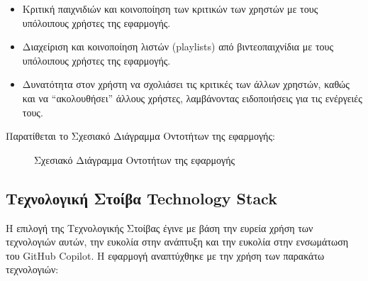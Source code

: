 \begin{itemize}
\item
  Κριτική παιχνιδιών και κοινοποίηση των κριτικών των χρηστών με τους
  υπόλοιπους χρήστες της εφαρμογής.
\item
  Διαχείριση και κοινοποίηση λιστών \textlatin{(playlists)} από
  βιντεοπαιχνίδια με τους υπόλοιπους χρήστες της εφαρμογής.
\item
  Δυνατότητα στον χρήστη να σχολιάσει τις κριτικές των άλλων χρηστών,
  καθώς και να ``ακολουθήσει'' άλλους χρήστες, λαμβάνοντας ειδοποιήσεις
  για τις ενέργειές τους.
\end{itemize}

Παρατίθεται το Σχεσιακό Διάγραμμα Οντοτήτων της εφαρμογής:

\begin{figure}[H]
  \begin{center}
    \caption{Σχεσιακό Διάγραμμα Οντοτήτων της εφαρμογής}
  \end{center}
  \label{fig:RDD}
\end{figure}

\subsection{Τεχνολογική Στοίβα \textlatin{Technology Stack}}

Η επιλογή της Τεχνολογικής Στοίβας έγινε με βάση την ευρεία χρήση των
τεχνολογιών αυτών, την ευκολία στην ανάπτυξη και την ευκολία στην
ενσωμάτωση του \textlatin{GitHub Copilot}. Η εφαρμογή αναπτύχθηκε με την
χρήση των παρακάτω τεχνολογιών:

